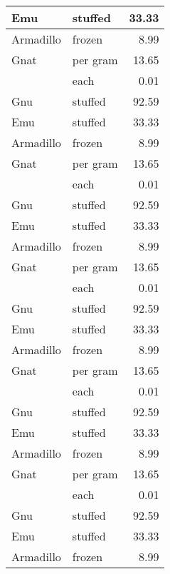 {\begin{center}
\begin{xtabular}{|l||l|r|}
\hline
Emu       & stuffed  & 33.33 \\
\hline
Armadillo & frozen   & 8.99  \\
\hline
Gnat      & per gram & 13.65 \\
\hline
          & each     & 0.01  \\
\hline
Gnu       & stuffed  & 92.59 \\
\hline
Emu       & stuffed  & 33.33 \\
\hline
Armadillo & frozen   & 8.99  \\
\hline
Gnat      & per gram & 13.65 \\
\hline
          & each     & 0.01  \\
\hline
Gnu       & stuffed  & 92.59 \\
\hline
Emu       & stuffed  & 33.33 \\
\hline
Armadillo & frozen   & 8.99  \\
\hline
Gnat      & per gram & 13.65 \\
\hline
          & each     & 0.01  \\
\hline
Gnu       & stuffed  & 92.59 \\
\hline
Emu       & stuffed  & 33.33 \\
\hline
Armadillo & frozen   & 8.99  \\
\hline
Gnat      & per gram & 13.65 \\
\hline
          & each     & 0.01  \\
\hline
Gnu       & stuffed  & 92.59 \\
\hline
Emu       & stuffed  & 33.33 \\
\hline
Armadillo & frozen   & 8.99  \\
\hline
Gnat      & per gram & 13.65 \\
\hline
          & each     & 0.01  \\
\hline
Gnu       & stuffed  & 92.59 \\
\hline
Emu       & stuffed  & 33.33 \\
\hline
Armadillo & frozen   & 8.99  \\
\hline
\end{xtabular}
\end{center}
} 
